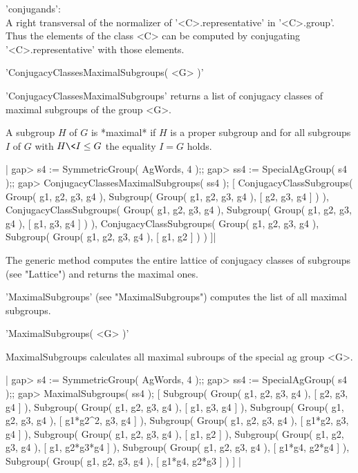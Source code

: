 'conjugands': \\
        A right transversal of the normalizer  of '<C>.representative' in
        '<C>.group'.  Thus the elements of the class <C> can be  computed
        by conjugating '<C>.representative' with those elements.


'ConjugacyClassesMaximalSubgroups( <G> )' 

'ConjugacyClassesMaximalSubgroups' returns a list of conjugacy classes of
maximal subgroups of the group <G>.

A subgroup  $H$ of $G$ is  *maximal* if $H$  is a proper subgroup and for
all subgroups $I$ of $G$ with $H \< I \leq G$ the equality $I = G$ holds.

|    gap> s4 := SymmetricGroup( AgWords, 4 );;
    gap> ss4 := SpecialAgGroup( s4 );;
    gap> ConjugacyClassesMaximalSubgroups( ss4 );
    [ ConjugacyClassSubgroups( Group( g1, g2, g3, g4 ), Subgroup( Group(
        g1, g2, g3, g4 ), [ g2, g3, g4 ] ) ),
      ConjugacyClassSubgroups( Group( g1, g2, g3, g4 ), Subgroup( Group(
        g1, g2, g3, g4 ), [ g1, g3, g4 ] ) ),
      ConjugacyClassSubgroups( Group( g1, g2, g3, g4 ), Subgroup( Group(
        g1, g2, g3, g4 ), [ g1, g2 ] ) ) ]|

The generic  method computes the entire lattice  of  conjugacy classes of
subgroups (see "Lattice") and returns the maximal ones.

'MaximalSubgroups'   (see "MaximalSubgroups")  computes the   list of all
maximal subgroups.


'MaximalSubgroups( <G> )' 

MaximalSubgroups calculates all maximal  subroups of the special ag group
<G>.

|    gap> s4 := SymmetricGroup( AgWords, 4 );;
    gap> ss4 := SpecialAgGroup( s4 );;
    gap> MaximalSubgroups( ss4 );
    [ Subgroup( Group( g1, g2, g3, g4 ), [ g2, g3, g4 ] ), 
      Subgroup( Group( g1, g2, g3, g4 ), [ g1, g3, g4 ] ), 
      Subgroup( Group( g1, g2, g3, g4 ), [ g1*g2^2, g3, g4 ] ), 
      Subgroup( Group( g1, g2, g3, g4 ), [ g1*g2, g3, g4 ] ), 
      Subgroup( Group( g1, g2, g3, g4 ), [ g1, g2 ] ), 
      Subgroup( Group( g1, g2, g3, g4 ), [ g1, g2*g3*g4 ] ), 
      Subgroup( Group( g1, g2, g3, g4 ), [ g1*g4, g2*g4 ] ), 
      Subgroup( Group( g1, g2, g3, g4 ), [ g1*g4, g2*g3 ] ) ]  |

